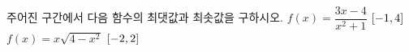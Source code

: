 주어진 구간에서 다음 함수의 최댓값과 최솟값을 구하시오.
 $f(x)=\dfrac{3x-4}{x^2+1}$ $[-1{,}\mkern3mu\mathopen{}4]$
 $f(x)=x\sqrt{4-x^2}$ $[-2{,}\mkern3mu\mathopen{}2]$
